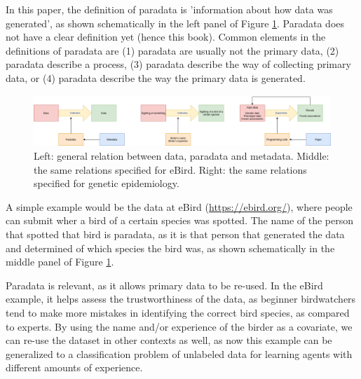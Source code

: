 
In this paper, the definition of paradata
is 'information about how data was generated',
as shown schematically in the left panel of Figure \ref{fig:figure_1}.
Paradata does not have a clear definition yet (hence this book). 
Common elements in the definitions of paradata are 
(1) paradata are usually not the primary data, (2) paradata describe
a process, (3) paradata describe the way of collecting primary data, or 
(4) paradata describe the way the primary data is generated.

\begin{figure}[!htbp]
  \centering
  \includegraphics[width=\linewidth]{figure_1.png}
  \caption{
    Left: general relation between data, paradata and metadata.
    Middle: the same relations specified for eBird.
    Right: the same relations specified for genetic epidemiology.
  }
  \label{fig:figure_1}
\end{figure}


A simple example would be the data at eBird (\url{https://ebird.org/}),
where people can submit wher a bird of a certain species was spotted.
The name of the person that spotted that bird is paradata, 
as it is that person that generated the data and determined of
which species the bird was, 
as shown schematically in the middle panel of Figure \ref{fig:figure_1}.


Paradata is relevant, as it allows primary data to be re-used.
In the eBird example, it helps assess the trustworthiness of the 
data, as beginner birdwatchers tend to make more mistakes in identifying
the correct bird species, as compared to experts.
By using the name and/or experience of the birder as a covariate,
we can re-use the dataset in other contexts as well,
as now this example can be generalized to
a classification problem of unlabeled
data for learning agents with different amounts 
of experience.

